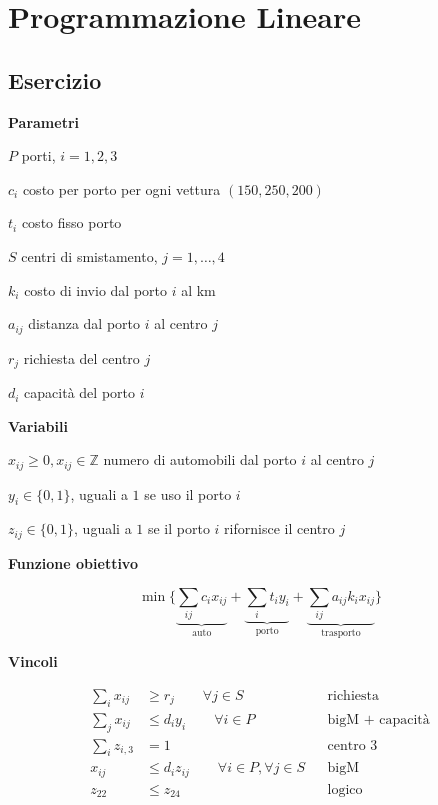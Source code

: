 \documentclass[10pt,a4paper,twoside,openright]{book}
\newcounter{es}
\newcommand{\Es}{
	\stepcounter{es}
	\section{Esercizio \arabic{es}}
	}
\newcommand{\Par}{\textbf{Parametri}}
\newcommand{\Var}{\textbf{Variabili}}
\newcommand{\Fob}{\textbf{Funzione obiettivo}}
\newcommand{\Vin}{\textbf{Vincoli}}
\begin{document}

\mainmatter
\pagestyle{fancy} %


\chapter{Programmazione Lineare}

\Es

\Par

$P$ porti, $i=1,2,3$

$c_{i}$ costo per porto per ogni vettura $( 150,250,200)$

$t_{i}$ costo fisso porto

$S$ centri di smistamento, $j=1,\dotsc ,4$

$k_{i}$ costo di invio dal porto $i$ al km

$a_{ij}$ distanza dal porto $i$ al centro $j$

$r_{j}$ richiesta del centro $j$

$d_{i}$ capacità del porto $i$

\Var

$x_{ij} \geq 0,x_{ij} \in \mathbb{Z}$ numero di automobili dal porto $i$ al centro $j$

$y_{i} \in \{0,1\}$, uguali a $1$ se uso il porto $i$

$z_{ij} \in \{0,1\}$, uguali a $1$ se il porto $i$ rifornisce il centro $j$

\Fob

\begin{equation*}
	\min\bigg\{\underbrace{\sum _{ij} c_{i} x_{ij}}_{\text{auto}} +\underbrace{\sum _{i} t_{i} y_{i}}_{\text{porto}} +\underbrace{\sum _{ij} a_{ij} k_{i} x_{ij}}_{\text{trasporto}}\bigg\}
\end{equation*}

\Vin

\begin{align*}
	\sum _{i} x_{ij} &\geq r_{j} \qquad\forall j\in S && \text{richiesta}\\
	\sum _{j} x_{ij} &\leq d_{i} y_{i} \qquad\forall i\in P && \text{bigM + capacità}\\
	\sum _{i} z_{i,3} &=1 && \text{centro 3}\\
	x_{ij} &\leq d_{i} z_{ij} \qquad\forall i\in P,\forall j\in S && \text{bigM}\\
	z_{22} &\leq z_{24} && \text{logico}\\
\end{align*}
\end{document}
